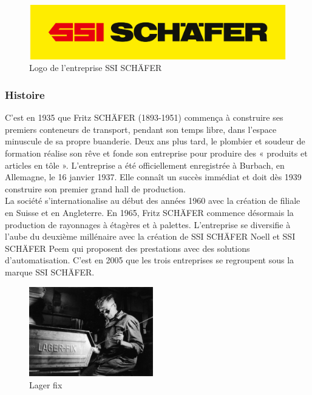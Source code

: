 \documentclass[a4paper, 12pt, french]{article}
\begin{document}
			\begin{figure}[h!]
				\begin{center}
					\includegraphics[width=0.7\linewidth]{images/schaefer.jpg}
				\end{center}
				\caption{Logo de l'entreprise SSI SCHÄFER}
				\label{fig:schaefer}
			\end{figure}	
		
			\subsubsection{Histoire}
	C'est en 1935 que Fritz SCHÄFER (1893-1951) commença à construire ses premiers conteneurs de transport, pendant son temps libre, dans l'espace minuscule de sa propre buanderie. Deux ans plus tard, le plombier et soudeur de formation réalise son rêve et fonde son entreprise pour produire des « produits et articles en tôle ». L'entreprise a été officiellement enregistrée à Burbach, en Allemagne, le 16 janvier 1937. Elle connaît un succès immédiat et doit dès 1939 construire son premier grand hall de production.\\

	La société s'internationalise au début des années 1960 avec la création de filiale en Suisse et en Angleterre. En 1965, Fritz SCHÄFER commence désormais la production de rayonnages à étagères et à palettes. L'entreprise se diversifie à l'aube du deuxième millénaire avec la création de SSI SCHÄFER Noell et SSI SCHÄFER Peem qui proposent des prestations avec des solutions d'automatisation. C'est en 2005 que les trois entreprises se regroupent sous la marque SSI SCHÄFER.\\

				\begin{figure}
					\label{fig:lager}
					\vspace{-20pt}
					\begin{center}
						\includegraphics[width=0.48\textwidth]{images/lager_fix.jpg}
					\end{center}
					\vspace{-20pt}
					\caption{Lager fix}
					\vspace{-10pt}
				\end{figure}
\end{document}
